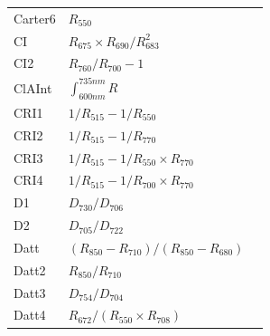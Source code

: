 \documentclass[remotesensing,article,submit,moreauthors,pdftex]{Definitions/mdpi}
\begin{document}
{\begin{supertabular}{lll}
		Carter6         & $R_{550}$                                                                                            & \cite{carter1994}             \\
		CI              & $R_{675}\times R_{690}/R_{683}^2$                                                                    & \cite{zarco-tejada2003a}      \\
		CI2             & $R_{760}/R_{700}-1$                                                                                  & \cite{gitelson2003}           \\
		ClAInt          & $\int_{600 nm}^{735 nm} R$                                                                           & \cite{oppelt2004}             \\
		CRI1            & $1/R_{515}-1/R_{550}$                                                                                & \cite{gitelson2003}           \\
		CRI2            & $1/R_{515}-1/R_{770}$                                                                                & \cite{gitelson2003}           \\
		CRI3            & $1/R_{515}-1/R_{550}\times R_{770}$                                                                  & \cite{gitelson2003}           \\
		CRI4            & $1/R_{515}-1/R_{700}\times R_{770}$                                                                  & \cite{gitelson2003}           \\
		D1              & $D_{730}/D_{706}$                                                                                    & \cite{zarco-tejada2003a}      \\
		D2              & $D_{705}/D_{722}$                                                                                    & \cite{zarco-tejada2003a}      \\
		Datt            & $(R_{850}-R_{710})/(R_{850}-R_{680})$                                                                & \cite{datt1999}               \\
		Datt2           & $R_{850}/R_{710}$                                                                                    & \cite{datt1999}               \\
		Datt3           & $D_{754}/D_{704}$                                                                                    & \cite{datt1999}               \\
		Datt4           & $R_{672}/(R_{550} \times R_{708})$                                                                   & \cite{datt1998}               \\

\end{supertabular}}
\end{document}
